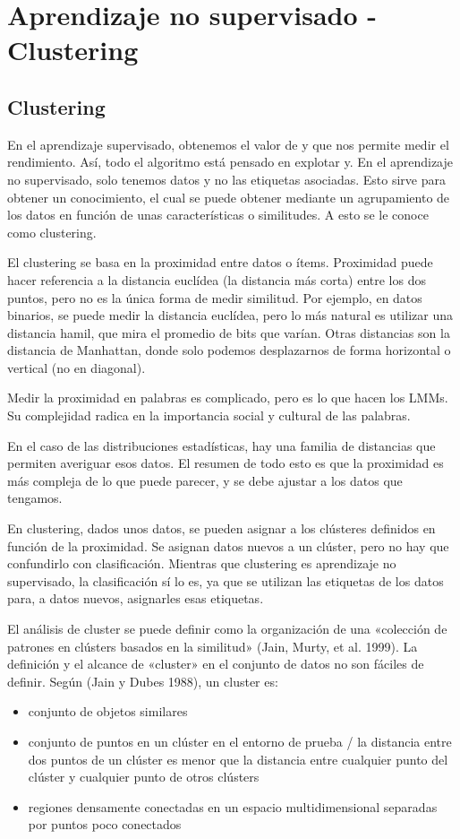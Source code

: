 \chapter{Aprendizaje no supervisado - Clustering}
\section{Clustering}
En el aprendizaje supervisado, obtenemos el valor de y que nos permite medir el rendimiento. Así, todo el algoritmo está pensado en explotar y. En el aprendizaje no supervisado, solo tenemos datos y no las etiquetas asociadas. Esto sirve para obtener un conocimiento, el cual se puede obtener mediante un agrupamiento de los datos en función de unas características o similitudes. A esto se le conoce como clustering. 

El clustering se basa en la proximidad entre datos o ítems. Proximidad puede hacer referencia a la distancia euclídea (la distancia más corta) entre los dos puntos, pero no es la única forma de medir similitud. Por ejemplo, en datos binarios, se puede medir la distancia euclídea, pero lo más natural es utilizar una distancia hamil, que mira el promedio de bits que varían. Otras distancias son la distancia de Manhattan, donde solo podemos desplazarnos de forma horizontal o vertical (no en diagonal). 

Medir la proximidad en palabras es complicado, pero es lo que hacen los LMMs. Su complejidad radica en la importancia social y cultural de las palabras. 

En el caso de las distribuciones estadísticas, hay una familia de distancias que permiten averiguar esos datos. El resumen de todo esto es que la proximidad es más compleja de lo que puede parecer, y se debe ajustar a los datos que tengamos. 

En clustering, dados unos datos, se pueden asignar a los clústeres definidos en función de la proximidad. Se asignan datos nuevos a un clúster, pero no hay que confundirlo con clasificación. Mientras que clustering es aprendizaje no supervisado, la clasificación sí lo es, ya que se utilizan las etiquetas de los datos para, a datos nuevos, asignarles esas etiquetas.

El análisis de cluster se puede definir como la organización de una «colección de patrones en clústers basados en la similitud» (Jain, Murty, et al. 1999).
La definición y el alcance de «cluster» en el conjunto de datos no son fáciles de definir. Según (Jain y Dubes 1988), un cluster es:
\begin{itemize}
\item conjunto de objetos similares
\item conjunto de puntos en un clúster en el entorno de prueba / la distancia entre dos puntos de un clúster es menor que la distancia entre cualquier punto del clúster y cualquier punto de otros clústers
\item regiones densamente conectadas en un espacio multidimensional separadas por puntos poco conectados
\end{itemize}

